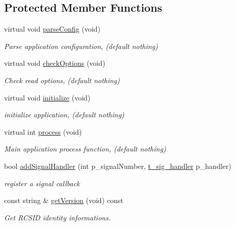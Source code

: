 \subsection*{Protected Member Functions}
\begin{DoxyCompactItemize}
\item 
virtual void \hyperlink{classxtd_1_1Application_a8684d1d061027893f91580106a821d88}{parse\+Config} (void)
\begin{DoxyCompactList}\small\item\em Parse application configuration, (default nothing) \end{DoxyCompactList}\item 
virtual void \hyperlink{classxtd_1_1Application_a3c63f070ac7baaea43a32b3064d0030b}{check\+Options} (void)
\begin{DoxyCompactList}\small\item\em Check read options, (default nothing) \end{DoxyCompactList}\item 
virtual void \hyperlink{classxtd_1_1Application_ab8e835ba678494c42e12c4613958d18a}{initialize} (void)
\begin{DoxyCompactList}\small\item\em initialize application, (default nothing) \end{DoxyCompactList}\item 
virtual int \hyperlink{classxtd_1_1Application_aef6043d47982bc1983a84e2c8a53f0cd}{process} (void)
\begin{DoxyCompactList}\small\item\em Main application process function, (default nothing) \end{DoxyCompactList}\item 
bool \hyperlink{classxtd_1_1Application_afdb5173d0105fcf549ee6f61e6dcbe49}{add\+Signal\+Handler} (int p\+\_\+signal\+Number, \hyperlink{classxtd_1_1Application_a907b6fe8247636495890e668530863d6}{t\+\_\+sig\+\_\+handler} p\+\_\+handler)
\begin{DoxyCompactList}\small\item\em register a signal callback \end{DoxyCompactList}\item 
const string \& \hyperlink{classxtd_1_1Application_ab7be8fa583daa66271562a83817b172c}{get\+Version} (void) const 
\begin{DoxyCompactList}\small\item\em Get R\+C\+S\+ID identity informations. \end{DoxyCompactList}\item 

\end{DoxyCompactItemize}
